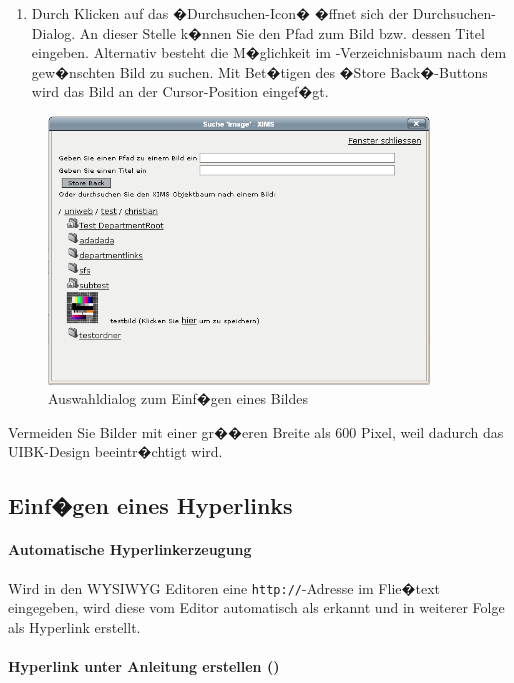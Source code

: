 \begin{enumerate}
	\item {Durch Klicken auf das �Durchsuchen-Icon� �ffnet sich der Durchsuchen-Dialog. An
dieser Stelle k�nnen Sie den Pfad zum Bild bzw. dessen Titel
eingeben. Alternativ besteht die M�glichkeit im -Verzeichnisbaum
nach dem gew�nschten Bild zu suchen. Mit Bet�tigen des �Store
Back�-Buttons wird das Bild an der Cursor-Position eingef�gt.}
\end{enumerate}

\begin{figure}[!ht]
	\centering
		\includegraphics[width=0.9\textwidth]{./images/suchebild.png}
	\caption{Auswahldialog zum Einf�gen eines Bildes}
	\label{fig:searchimage}
\end{figure}

\begin{Hinweis}
  Vermeiden Sie Bilder mit einer gr��eren Breite als 600 Pixel, weil
  dadurch das UIBK-Design beeintr�chtigt wird.
\end{Hinweis}

\subsection{Einf�gen eines Hyperlinks}
\label{inslink}

\paragraph{Automatische Hyperlinkerzeugung}
Wird in den WYSIWYG Editoren eine \nolinkurl{http://}-Adresse im Flie�text eingegeben,
wird diese vom Editor automatisch als  erkannt und in weiterer Folge als
Hyperlink erstellt.

\paragraph{Hyperlink unter Anleitung erstellen ()}

